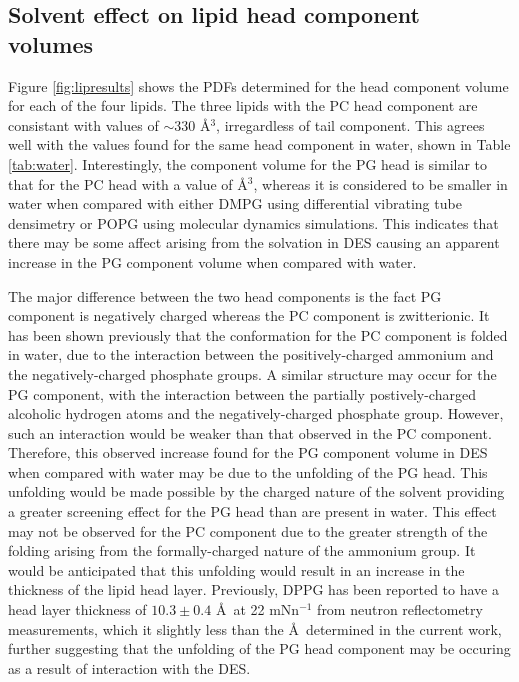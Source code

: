 \documentclass[twoside,twocolumn,9pt]{article}
\begin{document}
\subsection{Solvent effect on lipid head component volumes}
Figure \ref{fig:lipresults} shows the PDFs determined for the head component volume for each of the four lipids. The three lipids with the PC head component are consistant with values of $\sim330$ \AA$^3$, irregardless of tail component. This agrees well with the values found for the same head component in water, shown in Table \ref{tab:water}. Interestingly, the component volume for the PG head is similar to that for the PC head with a value of \AA$^3$, whereas it is considered to be smaller in water when compared with either DMPG using differential vibrating tube densimetry\cite{Pan2012} or POPG using molecular dynamics simulations.\cite{Kucerka2012} This indicates that there may be some affect arising from the solvation in DES causing an apparent increase in the PG component volume when compared with water.

The major difference between the two head components is the fact PG component is negatively charged whereas the PC component is zwitterionic. It has been shown previously that the conformation for the PC component is folded in water,\cite{Gilliams2016} due to the interaction between the positively-charged ammonium and the negatively-charged phosphate groups. A similar structure may occur for the PG component, with the interaction between the partially postively-charged alcoholic hydrogen atoms and the negatively-charged phosphate group. However, such an interaction would be weaker than that observed in the PC component. Therefore, this observed increase found for the PG component volume in DES when compared with water may be due to the unfolding of the PG head. This unfolding would be made possible by the charged nature of the solvent providing a greater screening effect for the PG head than are present in water. This effect may not be observed for the PC component due to the greater strength of the folding arising from the formally-charged nature of the ammonium group. It would be anticipated that this unfolding would result in an increase in the thickness of the lipid head layer. Previously, DPPG has been reported to have a head layer thickness of $10.3\pm0.4$ \AA\ at 22 mNn$^{-1}$ from neutron reflectometry measurements,\cite{Clifton2012} which it slightly less than the  \AA\ determined in the current work, further suggesting that the unfolding of the PG head component may be occuring as a result of interaction with the DES.
\end{document}
